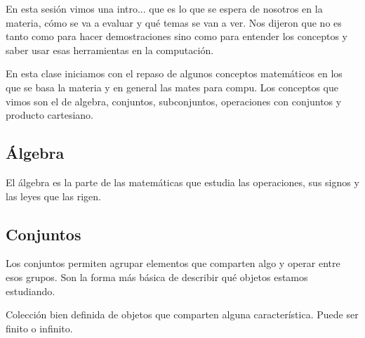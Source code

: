 \documentclass[11pt,letterpaper]{article}
\begin{document}

\portadilla
\newpage



\begin{quick_sum}
    En esta sesión vimos una intro... que es lo que se espera de nosotros en la
    materia, cómo se va a evaluar y qué temas se van a ver. Nos dijeron que
    no es tanto como para hacer demostraciones sino como para entender los 
    conceptos y saber usar esas herramientas en la computación.
\end{quick_sum}

\newpage



\begin{quick_sum}
    En esta clase iniciamos con el repaso de algunos conceptos
    matemáticos en los que se basa la materia y en general las mates
    para compu. Los conceptos que vimos son el de algebra, conjuntos,
    subconjuntos, operaciones con conjuntos y producto cartesiano.
\end{quick_sum}


\subsection*{Álgebra}

El álgebra es la parte de las matemáticas que estudia las operaciones,
sus signos y las leyes que las rigen.


\subsection*{Conjuntos}

Los conjuntos permiten agrupar elementos que comparten algo y operar
entre esos grupos. Son la forma más básica de describir qué objetos
estamos estudiando.

\begin{definicion}[Conjunto]
    Colección bien definida de objetos que comparten alguna
    característica. Puede ser finito o infinito.
\end{definicion}
\end{document}
